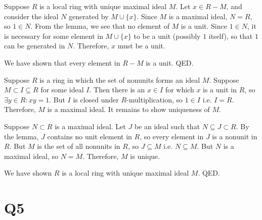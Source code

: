 \documentclass[]{article}
\begin{document}
	Suppose $R$ is a local ring with unique maximal ideal $M$.\newline
	Let $x \in R-M$, and consider the ideal $N$ generated by $M \cup \{x\}$.\newline
	Since $M$ is a maximal ideal, $N = R$, so $1 \in N$.\newline
	From the lemma, we see that no element of $M$ is a unit.\newline
	Since $1 \in N$, it is necessary for some element in $M \cup \{x\}$ to be a unit (possibly $1$ itself), so that $1$ can be generated in $N$.\newline
	Therefore, $x$ must be a unit.\newline\newline
	
	We have shown that every element in $R-M$ is a unit. QED.\newline\newline
	
	Suppose $R$ is a ring in which the set of nonunits forms an ideal $M$.\newline
	Suppose $M \subset I \subseteq R$ for some ideal $I$.\newline
	Then there is an $x \in I$ for which $x$ is a unit in $R$, so $\exists y \in R: xy = 1$.\newline
	But $I$ is closed under $R$-multiplication, so $1 \in I$ i.e. $I = R$.\newline
	Therefore, $M$ is a maximal ideal. It remains to show uniqueness of $M$.\newline\newline
	
	Suppose $N \subset R$ is a maximal ideal. Let $J$ be an ideal such that $N \subseteq J \subset R$.\newline
	By the lemma, $J$ contains no unit element in $R$, so every element in $J$ is a nonunit in $R$.\newline
	But $M$ is the set of all nonunits in $R$, so $J \subseteq M$ i.e. $N \subseteq M$.\newline
	But $N$ is a maximal ideal, so $N = M$.\newline
	Therefore, $M$ is unique.\newline\newline
	
	We have shown $R$ is a local ring with unique maximal ideal $M$. QED.

\section*{Q5}
\end{document}
